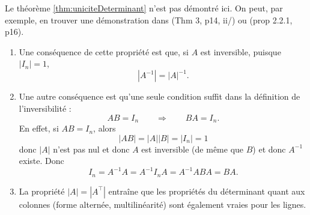 \proof
Le théorème \ref{thm:uniciteDeterminant} n'est pas démontré ici. On peut, par exemple, en trouver une démonstration dans \cite{GAJ94} (Thm 3, p14, ii/) ou \cite{Ser01} (prop 2.2.1, p16).
\eproof

\remarks 
\begin{enumerate}
  \item Une conséquence de cette propriété est que, si $A$ est inversible, puisque $|I_n| = 1$,
  $$
  |A^{-1}| = |A|^{-1}.
  $$
  \item Une autre conséquence est qu'une seule condition suffit dans la définition de l'inversibilité : 
  $$
  AB = I_n \qquad \Rightarrow \qquad BA = I_n.
  $$
  En effet, si $AB = I_n$, alors
  $$
  |AB| = |A| |B| = |I_n| = 1
  $$
  donc $|A|$ n'est pas nul et donc $A$ est inversible (de même que $B$) et donc $A^{-1}$ existe. Donc
  $$
  I_n = A^{-1} A = A^{-1} I_n A = A^{-1} A B A = B A.
  $$
 \item La propriété $|A| = |A^\top|$ entraîne que les propriétés du déterminant quant aux colonnes (forme alternée, multilinéarité) sont également vraies pour les lignes. 
\end{enumerate}

